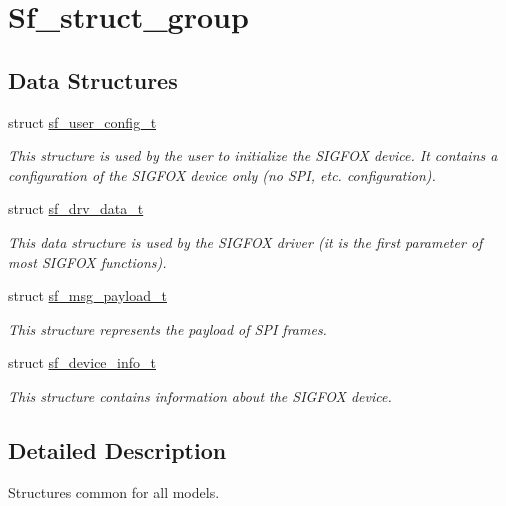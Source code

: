 \hypertarget{group__sf__struct__group}{}\section{Sf\+\_\+struct\+\_\+group}
\label{group__sf__struct__group}
\subsection*{Data Structures}
\begin{DoxyCompactItemize}
\item 
struct \mbox{\hyperlink{structsf__user__config__t}{sf\+\_\+user\+\_\+config\+\_\+t}}
\begin{DoxyCompactList}\small\item\em This structure is used by the user to initialize the S\+I\+G\+F\+OX device. It contains a configuration of the S\+I\+G\+F\+OX device only (no S\+PI, etc. configuration). \end{DoxyCompactList}\item 
struct \mbox{\hyperlink{structsf__drv__data__t}{sf\+\_\+drv\+\_\+data\+\_\+t}}
\begin{DoxyCompactList}\small\item\em This data structure is used by the S\+I\+G\+F\+OX driver (it is the first parameter of most S\+I\+G\+F\+OX functions). \end{DoxyCompactList}\item 
struct \mbox{\hyperlink{structsf__msg__payload__t}{sf\+\_\+msg\+\_\+payload\+\_\+t}}
\begin{DoxyCompactList}\small\item\em This structure represents the payload of S\+PI frames. \end{DoxyCompactList}\item 
struct \mbox{\hyperlink{structsf__device__info__t}{sf\+\_\+device\+\_\+info\+\_\+t}}
\begin{DoxyCompactList}\small\item\em This structure contains information about the S\+I\+G\+F\+OX device. \end{DoxyCompactList}\end{DoxyCompactItemize}


\subsection{Detailed Description}
Structures common for all models. 